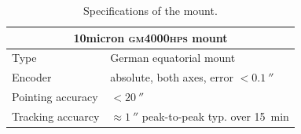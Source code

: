 \documentclass[a4paper, 11pt, fleqn]{memoir}
\begin{document}
\begin{table}[h!]
    \centering
    \begin{tabular}{ll}
        \toprule
        \multicolumn{2}{c}{\textbf{10micron \textsc{gm4000hps} mount}}                           \\
        \midrule
        Type              & German equatorial mount                                              \\
        Encoder           & absolute, both axes, error $< \SI{0.1}{\arcsecond}$                  \\
        Pointing accuracy & $< \SI{20}{\arcsecond}$                                              \\
        Tracking accuarcy & $\approx \SI{1}{\arcsecond}$ peak-to-peak typ. over \SI{15}{\minute} \\
        \bottomrule
    \end{tabular}
    \caption{Specifications of the mount.}
    \label{tab:specs-mount}
\end{table}
\end{document}
